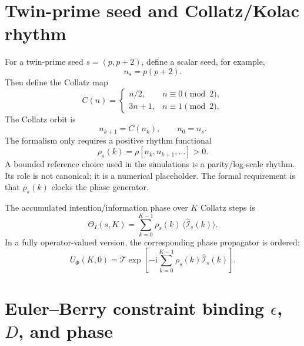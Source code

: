 \documentclass[11pt,a4paper]{article}
\newcommand{\ii}{\mathrm i}
\newcommand{\Iop}{\hat{\mathcal I}}
\newcommand{\ThI}{\Theta_I}
\begin{document}
\section{Twin-prime seed and Collatz/Kolac rhythm}

For a twin-prime seed $s=(p,p+2)$, define a scalar seed, for example,
\begin{equation}
  n_s=p(p+2).
\end{equation}
Then define the Collatz map
\begin{equation}
  C(n)=
  \begin{cases}
    n/2, & n\equiv0\pmod 2,\\
    3n+1, & n\equiv1\pmod 2.
  \end{cases}
\end{equation}
The Collatz orbit is
\begin{equation}
  n_{k+1}=C(n_k),\qquad n_0=n_s.
\end{equation}
The formalism only requires a positive rhythm functional
\begin{equation}
  \rho_s(k)=\rho[n_k,n_{k+1},\ldots]>0.
\end{equation}
A bounded reference choice used in the simulations is a parity/log-scale rhythm. Its role is not canonical; it is a numerical placeholder. The formal requirement is that $\rho_s(k)$ clocks the phase generator.

The accumulated intention/information phase over $K$ Collatz steps is
\begin{equation}
  \boxed{
  \ThI(s,K)=\sum_{k=0}^{K-1}\rho_s(k)\,\langle\Iop_s(k)\rangle.}
  \label{eq:intention_phase}
\end{equation}
In a fully operator-valued version, the corresponding phase propagator is ordered:
\begin{equation}
  U_\Phi(K,0)=
  \mathcal T\exp\left[-\ii\sum_{k=0}^{K-1}\rho_s(k)\Iop_s(k)\right].
  \label{eq:phase_propagator}
\end{equation}

\section{Euler--Berry constraint binding $\epsilon$, $D$, and phase}
\end{document}
